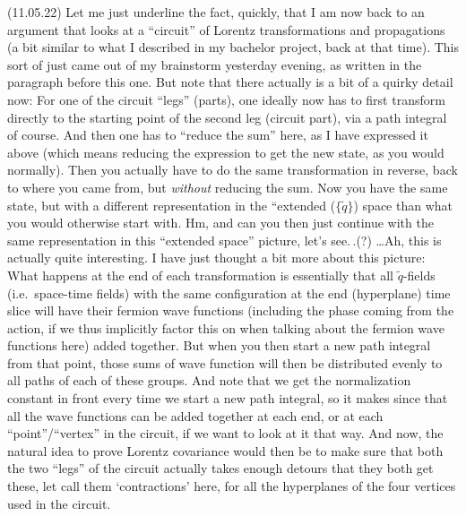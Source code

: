\documentclass{report}
\begin{document}
(11.05.22) Let me just underline the fact, quickly, that I am now back to an argument that looks at a ``circuit'' of Lorentz transformations and propagations (a bit similar to what I described in my bachelor project, back at that time). This sort of just came out of my brainstorm yesterday evening, as written in the paragraph before this one. But note that there actually is a bit of a quirky detail now: For one of the circuit ``legs'' (parts), one ideally now has to first transform directly to the starting point of the second leg (circuit part), via a path integral of course. And then one has to ``reduce the sum'' here, as I have expressed it above (which means reducing the expression to get the new state, as you would normally). Then you actually have to do the same transformation in reverse, back to where you came from, but \emph{without} reducing the sum. Now you have the same state, but with a different representation in the ``extended ($\{\tilde q\}$) space than what you would otherwise start with. Hm, and can you then just continue with the same representation in this ``extended space'' picture, let's see.\,.(?) %
\ldots Ah, this is actually quite interesting. I have just thought a bit more about this picture: What happens at the end of each transformation is essentially that all $\tilde q$-fields (i.e.\ space-time fields) with the same configuration at the end (hyperplane) time slice will have their fermion wave functions (including the phase coming from the action, if we thus implicitly factor this on when talking about the fermion wave functions here) added together. But when you then start a new path integral from that point, those sums of wave function will then be distributed evenly to all paths of each of these groups. And note that we get the normalization constant in front every time we start a new path integral, so it makes since that all the wave functions can be added together at each end, or at each ``point''/``vertex'' in the circuit, if we want to look at it that way. And now, the natural idea to prove Lorentz covariance would then be to make sure that both the two ``legs'' of the circuit actually takes enough detours that they both get these, let call them `contractions' here, for all the hyperplanes of the four vertices used in the circuit. %
\end{document}
